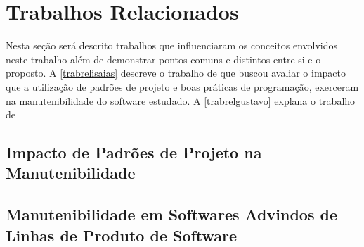 \chapter{Trabalhos Relacionados}\label{trabalhorel}
Nesta seção será descrito trabalhos que influenciaram os conceitos envolvidos neste trabalho além de demonstrar pontos comuns e distintos entre si e o proposto. A \autoref{trabrelisaias} descreve o trabalho de  que buscou avaliar o impacto que a utilização de padrões de projeto e boas práticas de programação, exerceram na manutenibilidade do software estudado. A \autoref{trabrelgustavo} explana o trabalho de 
\section{Impacto de Padrões de Projeto na Manutenibilidade} \label{trabrelisaias}
\section{Manutenibilidade em Softwares Advindos de Linhas de Produto de Software} \label{trabrelgustavo}